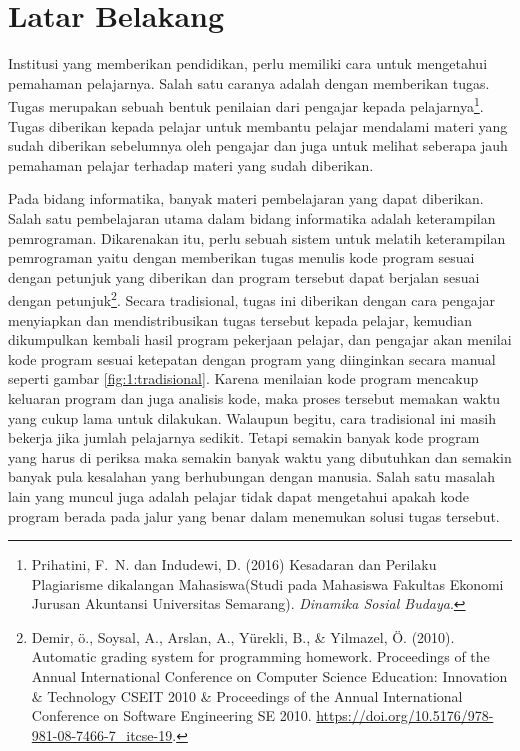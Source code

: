 \documentclass[a4paper,twoside]{article}
\begin{document}
\section{Latar Belakang}

Institusi yang memberikan pendidikan, perlu memiliki cara untuk mengetahui pemahaman pelajarnya. Salah satu caranya adalah dengan memberikan tugas. Tugas merupakan sebuah bentuk penilaian dari pengajar kepada pelajarnya\footnote{Prihatini, F.~N. dan Indudewi, D. (2016) {Kesadaran dan Perilaku Plagiarisme dikalangan Mahasiswa(Studi pada Mahasiswa Fakultas Ekonomi Jurusan Akuntansi Universitas Semarang)}.
{\em Dinamika Sosial Budaya}.}. Tugas diberikan kepada pelajar untuk membantu pelajar mendalami materi yang sudah diberikan sebelumnya oleh pengajar dan juga untuk melihat seberapa jauh pemahaman pelajar terhadap materi yang sudah diberikan.

Pada bidang informatika, banyak materi pembelajaran yang dapat diberikan. Salah satu pembelajaran utama dalam bidang informatika adalah keterampilan pemrograman. Dikarenakan itu, perlu sebuah sistem untuk melatih keterampilan pemrograman yaitu dengan memberikan tugas menulis kode program sesuai dengan petunjuk yang diberikan dan program tersebut dapat berjalan sesuai dengan petunjuk\footnote{
	Demir, \"o., Soysal, A., Arslan, A., Y\"urekli, B., \& Yilmazel, \"O. (2010). Automatic grading system for programming homework.
	Proceedings of the Annual International Conference on Computer Science Education: Innovation \& Technology CSEIT 2010 \&  Proceedings of the Annual International Conference on Software Engineering SE 2010. \url{https://doi.org/10.5176/978-981-08-7466-7_itcse-19}.
}.
Secara tradisional, tugas ini diberikan dengan cara pengajar menyiapkan dan mendistribusikan tugas tersebut kepada pelajar, kemudian dikumpulkan kembali hasil program pekerjaan pelajar, dan pengajar akan menilai kode program sesuai ketepatan dengan program yang diinginkan secara manual seperti gambar \ref{fig:1:tradisional}. Karena menilaian kode program mencakup keluaran program dan juga analisis kode, maka proses tersebut memakan waktu yang cukup lama untuk dilakukan. Walaupun begitu, cara tradisional ini masih bekerja jika jumlah pelajarnya sedikit.
Tetapi semakin banyak kode program yang harus di periksa maka semakin banyak waktu yang dibutuhkan dan semakin banyak pula kesalahan yang berhubungan dengan manusia. Salah satu masalah lain yang muncul juga adalah pelajar tidak dapat mengetahui apakah kode program berada pada jalur yang benar dalam menemukan solusi tugas tersebut.
\end{document}
